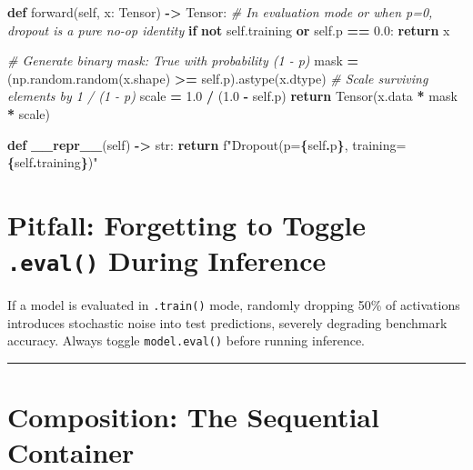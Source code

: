 \documentclass[
  letterpaper,
]{scrbook}
\newenvironment{Shaded}{\begin{snugshade}}{\end{snugshade}}
\newcommand{\BuiltInTok}[1]{#1}
\newcommand{\CommentTok}[1]{\textcolor[rgb]{0.56,0.35,0.01}{\textit{#1}}}
\newcommand{\ControlFlowTok}[1]{\textcolor[rgb]{0.13,0.29,0.53}{\textbf{#1}}}
\newcommand{\FloatTok}[1]{\textcolor[rgb]{0.00,0.00,0.81}{#1}}
\newcommand{\FunctionTok}[1]{\textcolor[rgb]{0.13,0.29,0.53}{\textbf{#1}}}
\newcommand{\KeywordTok}[1]{\textcolor[rgb]{0.13,0.29,0.53}{\textbf{#1}}}
\newcommand{\NormalTok}[1]{#1}
\newcommand{\OperatorTok}[1]{\textcolor[rgb]{0.81,0.36,0.00}{\textbf{#1}}}
\newcommand{\SpecialCharTok}[1]{\textcolor[rgb]{0.81,0.36,0.00}{\textbf{#1}}}
\newcommand{\SpecialStringTok}[1]{\textcolor[rgb]{0.31,0.60,0.02}{#1}}
\newcommand{\VariableTok}[1]{\textcolor[rgb]{0.00,0.00,0.00}{#1}}
\begin{document}
\begin{Shaded}
\begin{Highlighting}[]
    \KeywordTok{def}\NormalTok{ forward(}\VariableTok{self}\NormalTok{, x: Tensor) }\OperatorTok{{-}\textgreater{}}\NormalTok{ Tensor:}
        \CommentTok{\# In evaluation mode or when p=0, dropout is a pure no{-}op identity}
        \ControlFlowTok{if} \KeywordTok{not} \VariableTok{self}\NormalTok{.training }\KeywordTok{or} \VariableTok{self}\NormalTok{.p }\OperatorTok{==} \FloatTok{0.0}\NormalTok{:}
            \ControlFlowTok{return}\NormalTok{ x}

        \CommentTok{\# Generate binary mask: True with probability (1 {-} p)}
\NormalTok{        mask }\OperatorTok{=}\NormalTok{ (np.random.random(x.shape) }\OperatorTok{\textgreater{}=} \VariableTok{self}\NormalTok{.p).astype(x.dtype)}
        \CommentTok{\# Scale surviving elements by 1 / (1 {-} p)}
\NormalTok{        scale }\OperatorTok{=} \FloatTok{1.0} \OperatorTok{/}\NormalTok{ (}\FloatTok{1.0} \OperatorTok{{-}} \VariableTok{self}\NormalTok{.p)}
        \ControlFlowTok{return}\NormalTok{ Tensor(x.data }\OperatorTok{*}\NormalTok{ mask }\OperatorTok{*}\NormalTok{ scale)}

    \KeywordTok{def} \FunctionTok{\_\_repr\_\_}\NormalTok{(}\VariableTok{self}\NormalTok{) }\OperatorTok{{-}\textgreater{}} \BuiltInTok{str}\NormalTok{:}
        \ControlFlowTok{return} \SpecialStringTok{f"Dropout(p=}\SpecialCharTok{\{}\VariableTok{self}\SpecialCharTok{.}\NormalTok{p}\SpecialCharTok{\}}\SpecialStringTok{, training=}\SpecialCharTok{\{}\VariableTok{self}\SpecialCharTok{.}\NormalTok{training}\SpecialCharTok{\}}\SpecialStringTok{)"}
\end{Highlighting}
\end{Shaded}

\section{\texorpdfstring{Pitfall: Forgetting to Toggle \texttt{.eval()}
During
Inference}{Pitfall: Forgetting to Toggle .eval() During Inference}}\label{pitfall-forgetting-to-toggle-.eval-during-inference}

If a model is evaluated in \texttt{.train()} mode, randomly dropping
50\% of activations introduces stochastic noise into test predictions,
severely degrading benchmark accuracy. Always toggle
\texttt{model.eval()} before running inference.

\begin{center}\rule{0.5\linewidth}{0.5pt}\end{center}

\section{Composition: The Sequential
Container}\label{composition-the-sequential-container}
\end{document}
